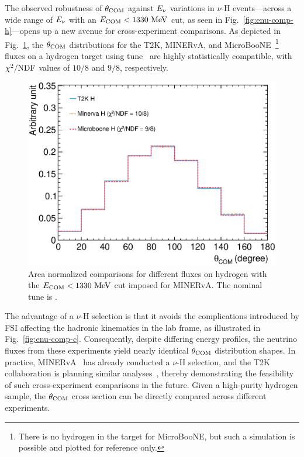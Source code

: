      The observed robustness of $\theta_{\textrm{COM}}$ against $E_{\nu}$ variations in $\nu$-H events—across a wide range of $E_{\nu}$ with an $E_{\textrm{COM}} < 1330~\textrm{MeV}$ cut, as seen in Fig.~\ref{fig:enu-comp-h}—opens up a new avenue for cross-experiment comparisons.
     As depicted in Fig.~\ref{fig:flux-comp}, the $\theta_{\textrm{COM}}$ distributions for the T2K, MINERvA, and MicroBooNE~\footnote{There is no hydrogen in the target for MicroBooNE, but such a simulation is possible and plotted for reference only.} fluxes on a hydrogen target using tune \gZero\ are highly statistically compatible, with $\chi^2/{\textrm{NDF}}$ values of $10/8$ and $9/8$, respectively.
     \begin{figure}
     \includegraphics[width=\scfigwid\textwidth]{figures/COM/anorm-flux-9bin-wcut_da_tan.eps}
     \caption{Area normalized comparisons for different fluxes on hydrogen with the $E_{\textrm{COM}}<1330~\textrm{MeV}$ cut imposed for MINERvA. The nominal tune is \gZero.}
     \label{fig:flux-comp}
     \end{figure}
     The advantage of a $\nu$-H selection is that it avoids the complications introduced by FSI affecting the hadronic kinematics in the lab frame, as illustrated in Fig.~\ref{fig:enu-comp-c}.
     Consequently, despite differing energy profiles, the neutrino fluxes from these experiments yield nearly identical $\theta_{\textrm{COM}}$ distribution shapes.
     In practice, MINERvA~\cite{MINERvA:2023avz} has already conducted a $\nu$-H selection, and the T2K collaboration is planning similar analyses~\cite{Lu:2015hea}, thereby demonstrating the feasibility of such cross-experiment comparisons in the future.
     Given a high‐purity hydrogen sample, the $\theta_{\textrm{COM}}$ cross section can be directly compared across different experiments.

